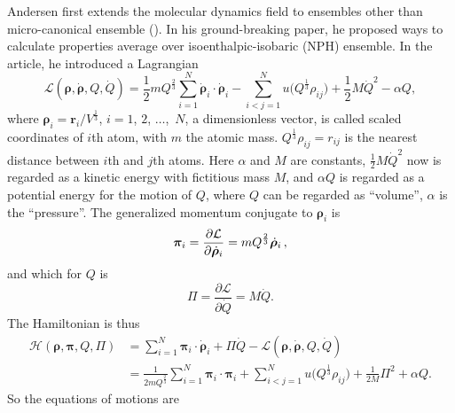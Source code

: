 Andersen first extends the molecular dynamics field to
ensembles other than micro-canonical ensemble (\cite{Andersen:1980ew}).
In his ground-breaking paper, he proposed ways to calculate properties average
over isoenthalpic-isobaric (NPH) ensemble. In the article, he introduced
a Lagrangian
\begin{equation}\label{eq:andersenlagrang}
	\mathcal{L}(\bm{\rho}, \dot{\bm{\rho}}, Q, \dot{ Q }) = \frac{ 1 }{ 2 } m
	Q^{\frac{ 2 }{ 3 }}
	\sum_{i=1}^{N} \dot{ \bm{\rho} }_i \cdot \dot{ \bm{\rho} }_i - \sum_{i<j=1}^{N}
	u \big(Q^{\frac{ 1 }{ 3 }} \rho_{ij} \big) + \frac{ 1 }{ 2 } M \dot{ Q } ^2 -
	\alpha Q,
\end{equation}
where $\bm{\rho}_i = \bm{r}_i / V ^{\frac{ 1 }{ 3 }}$, $i=1$, $2$, $\ldots$,~$N$,
a dimensionless vector,
is called scaled coordinates of $i$th atom, with $m$ the atomic mass. 
$Q^{\frac{ 1 }{ 3 }}\rho_{ij} = r_{ij}$ is the nearest distance between
$i$th and $j$th atoms.
Here $\alpha$ and $M$ are constants,
$\frac{ 1 }{ 2 } M \dot{ Q }^2$ now is regarded as a kinetic energy with fictitious
mass $M$,
and $\alpha Q$ is regarded as a potential energy for the motion of $Q$,
where $Q$ can be regarded as ``volume'', $\alpha$ is the ``pressure''.
The generalized momentum conjugate to $\bm{\rho}_i$ is
\begin{equation}
	\bm{\pi}_i = \frac{ \partial \mathcal{L} }{ \partial \dot{ \bm{\rho} }_i } =
	m Q^{\frac{ 2 }{ 3 }} \dot{\bm{\rho}}_i \thinspace,
\end{equation}
and which for $Q$ is
\begin{equation}
	\Pi = \frac{ \partial \mathcal{L} }{ \partial \dot{Q} } = M \dot{ Q }.
\end{equation}
The Hamiltonian is thus
\begin{equation}
	\begin{split}
		\mathcal{H}(\bm{\rho}, \bm{\pi}, Q, \Pi) &= \sum_{i=1}^{N} \bm{\pi}_i \cdot
		\dot{ \bm{\rho} }_i + \Pi \dot{ Q } - \mathcal{L}
		(\bm{\rho}, \dot{\bm{\rho}}, Q, \dot{ Q })\\
		&= \frac{ 1 }{ 2 m Q^{\frac{ 2 }{ 3 }} }
		\sum_{i=1}^{N} \bm{\pi}_i \cdot \bm{\pi}_i
		+ \sum_{i<j=1}^{N} u\big(Q^{\frac{ 1 }{ 3 }} \rho_{ij}\big) + \frac{ 1 }{ 2 M }
		\Pi^2 + \alpha Q.
	\end{split}
\end{equation}
So the equations of motions are
